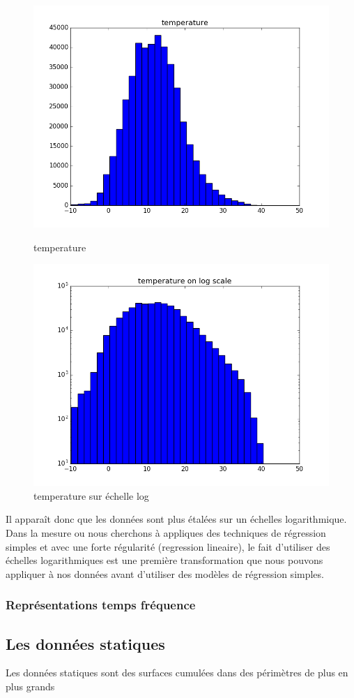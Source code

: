 \begin{figure}[H]
\captionsetup{labelformat=empty}
  \includegraphics[width=\linewidth]{images/temperature.png}
  \caption{temperature}
\endminipage\hfill
{}
  \includegraphics[width=\linewidth]{images/log_temperature.png}
  \caption{temperature sur échelle log}
\endminipage\hfill
\end{figure}

Il apparaît donc que les données sont plus étalées sur un échelles logarithmique.
Dans la mesure ou nous cherchons à appliques des techniques de régression simples et avec une forte régularité (regression lineaire), le fait d'utiliser des échelles logarithmiques est une première transformation que nous pouvons appliquer à nos données avant d'utiliser des modèles de régression simples.

\subsubsection{Représentations temps fréquence}

\subsection{Les données statiques}

Les données statiques sont des surfaces cumulées dans des périmètres de plus en plus grands

